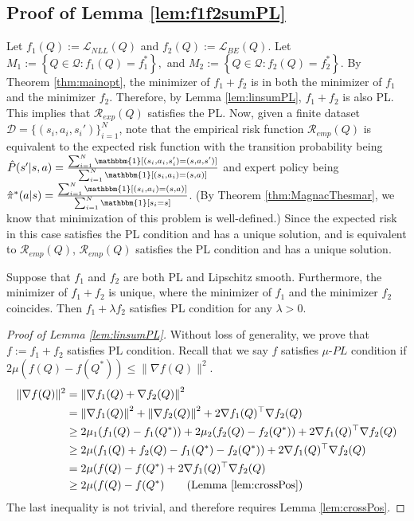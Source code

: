 \subsection{Proof of Lemma \ref{lem:f1f2sumPL}}
Let $f_1(Q):=\mathcal{L}_{NLL}(Q)$ and $f_2(Q):=\mathcal{L}_{BE}(Q)$. 
 Let $M_1:=\left\{Q \in \mathcal{Q}: f_1(Q)=f_1^*\right\}, $ and $ M_2:=\left\{Q \in \mathcal{Q}: f_2(Q)=f_2^*\right\}$.
 By Theorem \ref{thm:mainopt}, the minimizer of $f_1+f_2$ is in both the minimizer of $f_1$ and the minimizer $f_2$. Therefore, by Lemma \ref{lem:linsumPL}, $f_1+f_2$ is also PL. This implies that $\mathcal{R}_{exp}(Q)$ satisfies the PL. Now, given a finite dataset $\mathcal{D} = \{(s_i, a_i, s_i')\}_{i=1}^N$, note that the empirical risk function $\mathcal{R}_{emp}(Q)$ is equivalent to the expected risk function with the transition probability being $\hat{P}(s'|s,a) = \frac{\sum_{i=1}^N \mathbbm{1}[(s_i,a_i,s_i') = (s,a,s')]}{\sum_{i=1}^N \mathbbm{1}[(s_i,a_i) = (s,a)]}$ and expert policy being $\hat{\pi}^*(a|s) = \frac{\sum_{i=1}^N \mathbbm{1}[(s_i,a_i) = (s,a)]}{\sum_{i=1}^N \mathbbm{1}[s_i = s]}$. (By Theorem \ref{thm:MagnacThesmar}, we know that minimization of this problem is well-defined.) 
 Since the expected risk in this case satisfies the PL condition and has a unique solution, and is equivalent to $\mathcal{R}_{emp}(Q)$, $\mathcal{R}_{emp}(Q)$ satisfies the PL condition and has a unique solution. 

 
 
 \QED


 
\begin{lem}\label{lem:linsumPL}
Suppose that $f_1$ and $f_2$ are both PL and Lipschitz smooth. Furthermore, the minimizer of $f_1+f_2$ is unique, where the minimizer of $f_1$ and the minimizer $f_2$ coincides. Then $f_1+\lambda f_2$ satisfies PL condition for any $\lambda>0$.
\end{lem}

\begin{proof}[Proof of Lemma \ref{lem:linsumPL}] Without loss of generality, we prove that $f := f_1+f_2$ satisfies PL condition. Recall that we say $f$ satisfies $\mu$-$PL$ condition if $2\mu(f(Q)-f\left(Q^\ast\right)) \leq \|\nabla f(Q)\|^2$.
\begin{align}
    \|\nabla f(Q)\|^2&=\left\|\nabla f_1(Q)+\nabla f_2(Q)\right\|^2 \notag
    \\
    &=\left\|\nabla f_1(Q)\right\|^2 + \left\|\nabla f_2(Q)\right\|^2 + 2 \nabla f_1(Q)^{\top} \nabla f_2(Q) \notag
    \\
    &\ge 2\mu_1(f_1(Q)-f_1(Q^\ast)) +  2\mu_2(f_2(Q)-f_2(Q^\ast))+ 2 \nabla f_1(Q)^{\top} \nabla f_2(Q) \notag
    \\
    &\ge 2\mu(f_1(Q)+f_2(Q)-f_1(Q^\ast)-f_2(Q^\ast))+ 2 \nabla f_1(Q)^{\top} \nabla f_2(Q) \notag
    \\
    &=2\mu(f(Q)-f(Q^*) + 2 \nabla f_1(Q)^{\top} \nabla f_2(Q) \notag
    \\
    &\ge 2\mu(f(Q)-f(Q^*)\tag{Lemma \ref{lem:crossPos}}
\end{align}
The last inequality is not trivial, and therefore requires Lemma \ref{lem:crossPos}.

    
\end{proof}

